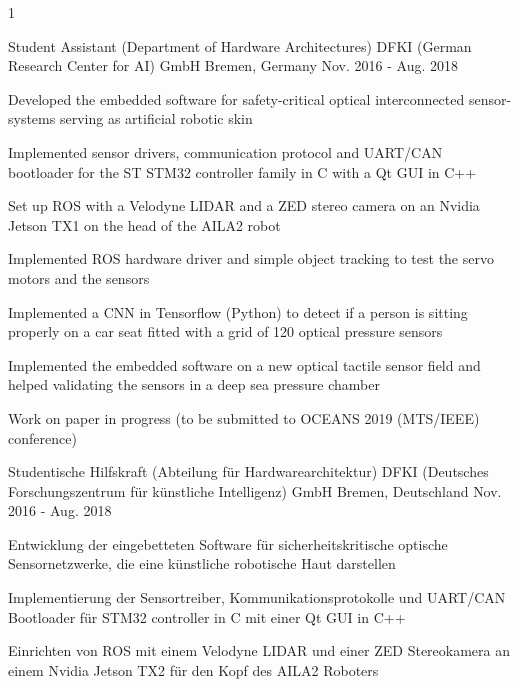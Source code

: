 \begin{cventries}
\multilang
  {1}
  {\cventry
    {Student Assistant (Department of Hardware Architectures)} %
    {DFKI (German Research Center for AI) GmbH} %
    {Bremen, Germany} %
    {Nov. 2016 - Aug. 2018} %
    {
      \begin{cvitems} %
        \item {Developed the embedded software for safety-critical optical interconnected sensor-systems serving as artificial robotic skin}
        \item {Implemented sensor drivers, communication protocol and UART/CAN bootloader for the ST STM32 controller family in C with a Qt GUI in C++}
        \item {Set up ROS with a Velodyne LIDAR and a ZED stereo camera on an Nvidia Jetson TX1 on the head of the AILA2 robot}
        \item {Implemented ROS hardware driver and simple object tracking to test the servo motors and the sensors}
        \item {Implemented a CNN in Tensorflow (Python) to detect if a person is sitting properly on a car seat fitted with a grid of 120 optical pressure sensors}
        \item {Implemented the embedded software on a new optical tactile sensor field and helped validating the sensors in a deep sea pressure chamber}
        \item {Work on paper in progress (to be submitted to OCEANS 2019 (MTS/IEEE) conference)}
      \end{cvitems}
    }
  }{\cventry
    {Studentische Hilfskraft (Abteilung für Hardwarearchitektur)} %
    {DFKI (Deutsches Forschungszentrum für künstliche Intelligenz) GmbH} %
    {Bremen, Deutschland} %
    {Nov. 2016 - Aug. 2018} %
    {
      \begin{cvitems} %
        \item {Entwicklung der eingebetteten Software für sicherheitskritische optische Sensornetzwerke, die eine künstliche robotische Haut darstellen}
        \item {Implementierung der Sensortreiber, Kommunikationsprotokolle und UART/CAN Bootloader für STM32 controller in C mit einer Qt GUI in C++}
        \item {Einrichten von ROS mit einem Velodyne LIDAR und einer ZED Stereokamera an einem Nvidia Jetson TX2 für den Kopf des AILA2 Roboters}

\end{cvitems}}}
\end{cventries}
